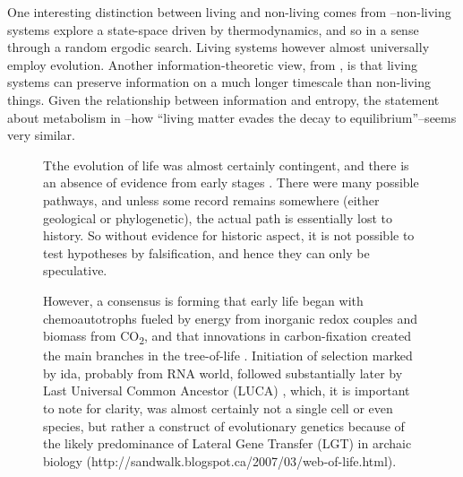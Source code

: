 One interesting distinction between living and non-living comes from \parencite{Rasmussen2004}--non-living systems explore a state-space driven by thermodynamics, and so in a sense through a random ergodic search. Living systems however almost universally employ evolution. Another information-theoretic view, from \parencite{Adami2015}, is that living systems can preserve information on a much longer timescale than non-living things. Given the relationship between information and entropy, the statement about metabolism in \cite{Schrodinger1944}--how ``living matter evades the decay to equilibrium''--seems very similar.

\begin{figure}
\begin{framed}


Tthe evolution of life was almost certainly contingent, and there is an absence of evidence from early stages \parencite{Pross2013}. There were many possible pathways, and unless some record remains somewhere (either geological or phylogenetic), the actual path is essentially lost to history. So without evidence for historic aspect, it is not possible to test hypotheses by falsification, and hence they can only be speculative.

However, a consensus is forming that early life began with chemoautotrophs fueled by energy from inorganic redox couples and biomass from CO\textsubscript{2}, and that innovations in carbon-fixation created the main branches in the tree-of-life \parencite{Braakman2012}. Initiation of selection marked by \gls{ida}, probably from RNA world, followed substantially later by Last Universal Common Ancestor (LUCA) \parencite{Yarus2011}, which, it is important to note for clarity, was almost certainly not a single cell or even species, but rather a construct of evolutionary genetics because of the likely predominance of Lateral Gene Transfer (LGT) in archaic biology (http://sandwalk.blogspot.ca/2007/03/web-of-life.html).


\end{framed}
\end{figure}
